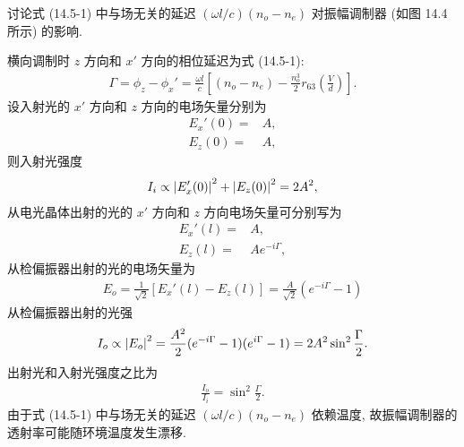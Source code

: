 \documentclass{note}
\begin{document}
\begin{exe}
    讨论式 (14.5-1) 中与场无关的延迟 $(\omega l/c)(n_o-n_e)$ 对振幅调制器 (如图 14.4 所示) 的影响.
\end{exe}
\begin{sol}
    横向调制时 $z$ 方向和 $x'$ 方向的相位延迟为式 (14.5-1):
    \begin{align}
        \Gamma=\phi_z-\phi_x'=\frac{\omega l}{c}\left[(n_o-n_e)-\frac{n_o^3}{2}r_{63}\left(\frac{V}{d}\right)\right].
    \end{align}
    设入射光的 $x'$ 方向和 $z$ 方向的电场矢量分别为
    \begin{align}
        E_x'(0)=&A,\\
        E_z(0)=&A,
    \end{align}
    则入射光强度
    \begin{align}
        I_i\propto\left\lvert E_x'(0)\right\rvert^2+\left\lvert E_z(0)\right\rvert^2=2A^2,
    \end{align}
    从电光晶体出射的光的 $x'$ 方向和 $z$ 方向电场矢量可分别写为
    \begin{align}
        E_x'(l)=&A,\\
        E_z(l)=&Ae^{-i\Gamma},
    \end{align}
    从检偏振器出射的光的电场矢量为
    \begin{align}
        E_o=\frac{1}{\sqrt{2}}[E_x'(l)-E_z(l)]=\frac{A}{\sqrt{2}}(e^{-i\Gamma}-1)
    \end{align}
    从检偏振器出射的光强
    \begin{align}
        I_o\propto\left\lvert E_o\right\rvert^2=\frac{A^2}{2}(e^{-i\Gamma}-1)(e^{i\Gamma}-1)=2A^2\sin^2\frac{\Gamma}{2}.
    \end{align}
    出射光和入射光强度之比为
    \begin{align}
        \frac{I_o}{I_i}=\sin^2\frac{\Gamma}{2}.
    \end{align}
    由于式 (14.5-1) 中与场无关的延迟 $(\omega l/c)(n_o-n_e)$ 依赖温度, 故振幅调制器的透射率可能随环境温度发生漂移.
\end{sol}
\end{document}
